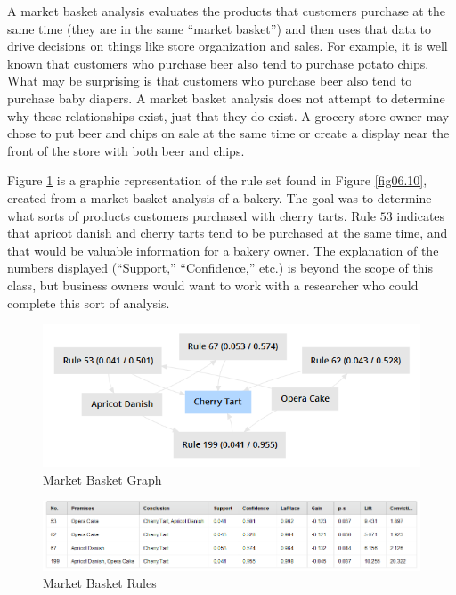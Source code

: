 A market basket analysis evaluates the products that customers purchase at the same time (they are in the same ``market basket'') and then uses that data to drive decisions on things like store organization and sales. For example, it is well known that customers who purchase beer also tend to purchase potato chips. What may be surprising is that customers who purchase beer also tend to purchase baby diapers. A market basket analysis does not attempt to determine why these relationships exist, just that they do exist. A grocery store owner may chose to put beer and chips on sale at the same time or create a display near the front of the store with both beer and chips. 

Figure \ref{fig06.06} is a graphic representation of the rule set found in Figure \ref{fig06.10}, created from a market basket analysis of a bakery. The goal was to determine what sorts of products customers purchased with cherry tarts. Rule $ 53 $ indicates that apricot danish and cherry tarts tend to be purchased at the same time, and that would be valuable information for a bakery owner. The explanation of the numbers displayed (``Support,'' ``Confidence,'' etc.) is beyond the scope of this class, but business owners would want to work with a researcher who could complete this sort of analysis.

\begin{figure}[H]
	\centering
	\includegraphics[width=\maxwidth{.95\linewidth}]{gfx/06-MarketBasketGraph}
	\caption{Market Basket Graph}
	\label{fig06.06}
\end{figure}


\begin{figure}[H]
	\centering
	\includegraphics[width=\maxwidth{.95\linewidth}]{gfx/06-MarketBasketRules}
	\caption{Market Basket Rules}
	\label{fig06.07}
\end{figure}

